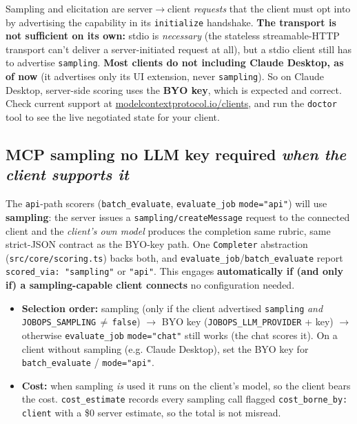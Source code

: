 \documentclass[11pt,letterpaper]{article}
\newcommand{\tool}[1]{\texttt{#1}}
\newcommand{\fpath}[1]{\texttt{#1}}
\begin{document}
\begin{warnbox}
Sampling and elicitation are server\(\rightarrow\)client \emph{requests} that the client must opt into by advertising the capability in its \texttt{initialize} handshake. \textbf{The transport is not sufficient on its own:} stdio is \emph{necessary} (the stateless streamable-HTTP transport can't deliver a server-initiated request at all), but a stdio client still has to advertise \texttt{sampling}. \textbf{Most clients do not \textemdash{} including Claude Desktop, as of now} (it advertises only its UI extension, never \texttt{sampling}). So on Claude Desktop, server-side scoring uses the \textbf{BYO key}, which is expected and correct. Check current support at \href{https://modelcontextprotocol.io/clients}{modelcontextprotocol.io/clients}, and run the \tool{doctor} tool to see the live negotiated state for your client.
\end{warnbox}

\subsection*{MCP sampling \textemdash{} no LLM key required \emph{when the client supports it}}

The \texttt{api}-path scorers (\tool{batch\_evaluate}, \tool{evaluate\_job} \texttt{mode="api"}) will use \textbf{sampling}: the server issues a \texttt{sampling/createMessage} request to the connected client and the \emph{client's own model} produces the completion \textemdash{} same rubric, same strict-JSON contract as the BYO-key path. One \texttt{Completer} abstraction (\fpath{src/core/scoring.ts}) backs both, and \tool{evaluate\_job}/\tool{batch\_evaluate} report \texttt{scored\_via: "sampling"} or \texttt{"api"}. This engages \textbf{automatically if (and only if) a sampling-capable client connects} \textemdash{} no configuration needed.

\begin{itemize}
\item \textbf{Selection order:} sampling (only if the client advertised \texttt{sampling} \emph{and} \texttt{JOBOPS\_SAMPLING}\,$\neq$\,\texttt{false}) \(\rightarrow\) BYO key (\texttt{JOBOPS\_LLM\_PROVIDER} + key) \(\rightarrow\) otherwise \tool{evaluate\_job} \texttt{mode="chat"} still works (the chat scores it). On a client without sampling (e.g. Claude Desktop), set the BYO key for \tool{batch\_evaluate} / \texttt{mode="api"}.
\item \textbf{Cost:} when sampling \emph{is} used it runs on the client's model, so the client bears the cost. \tool{cost\_estimate} records every sampling call flagged \texttt{cost\_borne\_by: client} with a \$0 server estimate, so the total is not misread.
\end{itemize}
\end{document}
